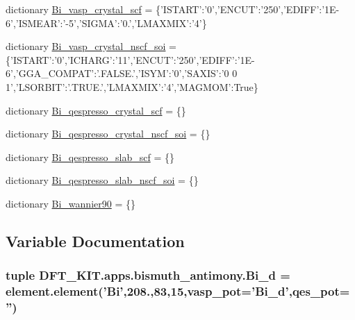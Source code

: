 \begin{DoxyCompactItemize}
\item 
dictionary \hyperlink{namespace_d_f_t___k_i_t_1_1apps_1_1bismuth__antimony_ab475abbbc15cd01fa76531119b87d038}{Bi\+\_\+vasp\+\_\+crystal\+\_\+scf} = \{'I\+S\+T\+A\+R\+T'\+:'0','E\+N\+C\+U\+T'\+:'250','E\+D\+I\+F\+F'\+:'1\+E-\/6','\+I\+S\+M\+E\+A\+R'\+:'-\/5','\+S\+I\+G\+M\+A'\+:'0.','\+L\+M\+A\+X\+M\+I\+X'\+:'4'\}
\item 
dictionary \hyperlink{namespace_d_f_t___k_i_t_1_1apps_1_1bismuth__antimony_a44bfb7c33246a8a0aba68758b5fa94fa}{Bi\+\_\+vasp\+\_\+crystal\+\_\+nscf\+\_\+soi} = \{'I\+S\+T\+A\+R\+T'\+:'0','I\+C\+H\+A\+R\+G'\+:'11','E\+N\+C\+U\+T'\+:'250','E\+D\+I\+F\+F'\+:'1\+E-\/6','\+G\+G\+A\+\_\+\+C\+O\+M\+P\+A\+T'\+:'.\+F\+A\+L\+S\+E.','\+I\+S\+Y\+M'\+:'0','\+S\+A\+X\+I\+S'\+:'0 0 1','\+L\+S\+O\+R\+B\+I\+T'\+:'.\+T\+R\+U\+E.','\+L\+M\+A\+X\+M\+I\+X'\+:'4','\+M\+A\+G\+M\+O\+M'\+:\+True\}
\item 
dictionary \hyperlink{namespace_d_f_t___k_i_t_1_1apps_1_1bismuth__antimony_acca8f4e3d0ae5de1c3bd1aee18a91917}{Bi\+\_\+qespresso\+\_\+crystal\+\_\+scf} = \{\}
\item 
dictionary \hyperlink{namespace_d_f_t___k_i_t_1_1apps_1_1bismuth__antimony_a2d9ad25d1a2a764b263a0f0c9cfef67d}{Bi\+\_\+qespresso\+\_\+crystal\+\_\+nscf\+\_\+soi} = \{\}
\item 
dictionary \hyperlink{namespace_d_f_t___k_i_t_1_1apps_1_1bismuth__antimony_a3a42f256e90e6cba1809e1b6caa9f168}{Bi\+\_\+qespresso\+\_\+slab\+\_\+scf} = \{\}
\item 
dictionary \hyperlink{namespace_d_f_t___k_i_t_1_1apps_1_1bismuth__antimony_a364bff2bee5cb80746d82205c445ad7c}{Bi\+\_\+qespresso\+\_\+slab\+\_\+nscf\+\_\+soi} = \{\}
\item 
dictionary \hyperlink{namespace_d_f_t___k_i_t_1_1apps_1_1bismuth__antimony_a95707d9864da25fbccf902580ebaecd0}{Bi\+\_\+wannier90} = \{\}
\end{DoxyCompactItemize}


\subsection{Variable Documentation}
\hypertarget{namespace_d_f_t___k_i_t_1_1apps_1_1bismuth__antimony_a09c7ba05ea616d81e4ba1eeec01e4fc0}{
\subsubsection[{Bi\+\_\+d}]{\setlength{\rightskip}{0pt plus 5cm}tuple D\+F\+T\+\_\+\+K\+I\+T.\+apps.\+bismuth\+\_\+antimony.\+Bi\+\_\+d = element.\+element('Bi',208.,83,15,vasp\+\_\+pot='Bi\+\_\+d',qes\+\_\+pot='')}}\label{namespace_d_f_t___k_i_t_1_1apps_1_1bismuth__antimony_a09c7ba05ea616d81e4ba1eeec01e4fc0}


